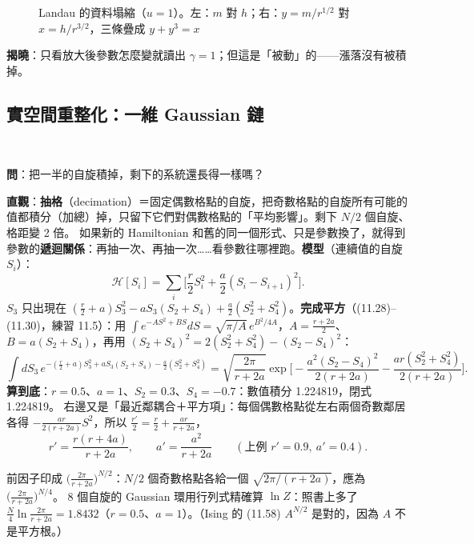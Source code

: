 \begin{figure}[htbp]
\centering
\ElevenFigCollapse
\caption{Landau 的資料塌縮（$u=1$）。左：$m$ 對 $h$；右：$y=m/r^{1/2}$ 對 $x=h/r^{3/2}$，三條疊成 $y+y^3=x$}\label{eleven-fig-collapse}
\end{figure}

\textbf{揭曉}：只看放大後參數怎麼變就讀出 $\gamma=1$；但這是「被動」的——漲落沒有被積掉。

\subsection{實空間重整化：一維 Gaussian 鏈}
\leavevmode{}\ \par\nopagebreak

\textbf{問}：把一半的自旋積掉，剩下的系統還長得一樣嗎？

\textbf{直觀}：\textbf{抽格}（decimation）＝固定偶數格點的自旋，把奇數格點的自旋所有可能的值都積分（加總）掉，只留下它們對偶數格點的「平均影響」。剩下 $N/2$ 個自旋、格距變 2 倍。
如果新的 Hamiltonian 和舊的同一個形式、只是參數換了，就得到參數的\textbf{遞迴關係}：再抽一次、再抽一次……看參數往哪裡跑。\textbf{模型}（連續值的自旋 $S_i$）：
\[\mathcal H[S_i]=\sum_i\Big[\frac r2S_i^2+\frac a2(S_i-S_{i+1})^2\Big].\tag{11.27}\]
$S_3$ 只出現在 $(\frac r2+a)S_3^2-aS_3(S_2+S_4)+\frac a2(S_2^2+S_4^2)$。\textbf{完成平方}（(11.28)--(11.30)，練習 11.5）：用 $\int e^{-AS^2+BS}dS=\sqrt{\pi/A}\,e^{B^2/4A}$，$A=\frac{r+2a}2$、$B=a(S_2+S_4)$，再用 $(S_2+S_4)^2=2(S_2^2+S_4^2)-(S_2-S_4)^2$：
\[\int dS_3\,e^{-(\frac r2+a)S_3^2+aS_3(S_2+S_4)-\frac a2(S_2^2+S_4^2)}=\sqrt{\frac{2\pi}{r+2a}}\exp\Big[-\frac{a^2(S_2-S_4)^2}{2(r+2a)}-\frac{ar(S_2^2+S_4^2)}{2(r+2a)}\Big].\tag{11.30}\]
\textbf{算到底}：$r=0.5$、$a=1$、$S_2=0.3$、$S_4=-0.7$：數值積分 1.224819，閉式 1.224819。
右邊又是「最近鄰耦合＋平方項」：每個偶數格點從左右兩個奇數鄰居各得 $-\frac{ar}{2(r+2a)}S^2$，所以 $\frac{r'}2=\frac r2+\frac{ar}{r+2a}$，
\[r'=\frac{r(r+4a)}{r+2a},\qquad a'=\frac{a^2}{r+2a}\qquad(\text{上例 }r'=0.9,\ a'=0.4).\tag{11.32--11.33}\]
\begin{errbox}[p.~265，(11.31)]
前因子印成 $\big(\frac{2\pi}{r+2a}\big)^{N/2}$：$N/2$ 個奇數格點各給一個 $\sqrt{2\pi/(r+2a)}$，應為 $\big(\frac{2\pi}{r+2a}\big)^{N/4}$。
8 個自旋的 Gaussian 環用行列式精確算 $\ln Z$：照書上多了 $\frac N4\ln\frac{2\pi}{r+2a}=1.8432$（$r=0.5$、$a=1$）。（Ising 的 (11.58) $A^{N/2}$ 是對的，因為 $A$ 不是平方根。）
\end{errbox}

